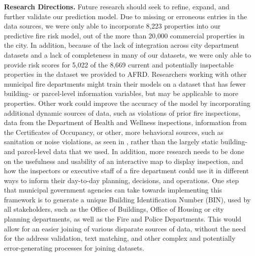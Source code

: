 \documentclass{sig-alternate-05-2015}
\begin{document}
{\textbf{Research Directions.} Future research should seek to refine, expand, and further validate our prediction model. Due to missing or erroneous entries in the data sources, we were only able to incorporate 8,223 properties into our predictive fire risk model, out of the more than 20,000 commercial properties in the city. In addition, because of the lack of integration across city department datasets and a lack of completeness in many of our datasets, we were only able to provide risk scores for 5,022 of the 8,669 current and potentially inspectable properties in the dataset we provided to AFRD. Researchers working with other municipal fire departments might train their models on a dataset that has fewer building- or parcel-level information variables, but may be applicable to more properties. Other work could improve the accuracy of the model by incorporating additional dynamic sources of data, such as violations of prior fire inspections, data from the Department of Health and Wellness inspections, information from the Certificates of Occupancy, or other, more behavioral sources, such as sanitation or noise violations, as seen in \cite{copeland15}, rather than the largely static building- and parcel-level data that we used. In addition, more research needs to be done on the usefulness and usability of an interactive map to display inspection, and how the inspectors or executive staff of a fire department could use it in different ways to inform their day-to-day planning, decisions, and operations. One step that municipal government agencies can take towards implementing this framework is to generate a unique Building Identification Number (BIN), used by all stakeholders, such as the Office of Buildings, Office of Housing or city planning departments, as well as the Fire and Police Departments. This would allow for an easier joining of various disparate sources of data, without the need for the address validation, text matching, and other complex and potentially error-generating processes for joining datasets.

}
\end{document}
